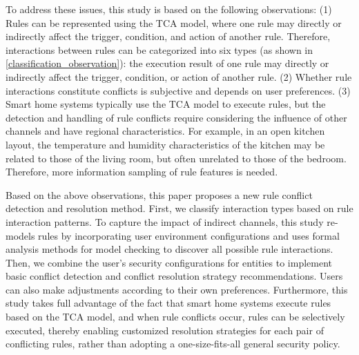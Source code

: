 To address these issues, this study is based on the following observations: (1) Rules can be represented using the TCA model, where one rule may directly or indirectly affect the trigger, condition, and action of another rule. Therefore, interactions between rules can be categorized into six types (as shown in \ref{classification_observation}): the execution result of one rule may directly or indirectly affect the trigger, condition, or action of another rule. (2) Whether rule interactions constitute conflicts is subjective and depends on user preferences. (3) Smart home systems typically use the TCA model to execute rules, but the detection and handling of rule conflicts require considering the influence of other channels and have regional characteristics. For example, in an open kitchen layout, the temperature and humidity characteristics of the kitchen may be related to those of the living room, but often unrelated to those of the bedroom. Therefore, more information sampling of rule features is needed.

Based on the above observations, this paper proposes a new rule conflict detection and resolution method. First, we classify interaction types based on rule interaction patterns. To capture the impact of indirect channels, this study re-models rules by incorporating user environment configurations and uses formal analysis methods for model checking to discover all possible rule interactions. Then, we combine the user's security configurations for entities to implement basic conflict detection and conflict resolution strategy recommendations. Users can also make adjustments according to their own preferences. Furthermore, this study takes full advantage of the fact that smart home systems execute rules based on the TCA model, and when rule conflicts occur, rules can be selectively executed, thereby enabling customized resolution strategies for each pair of conflicting rules, rather than adopting a one-size-fits-all general security policy.

